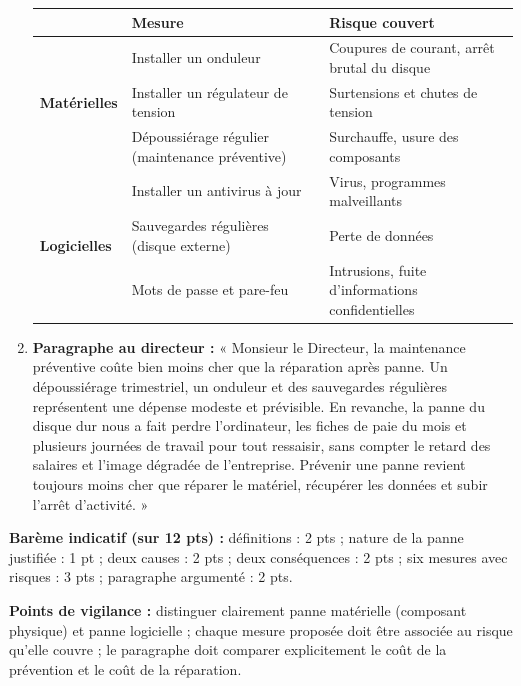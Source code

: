 \documentclass[11pt]{article}
\begin{document}
\begin{corrige}
\begin{enumerate}
\begin{center}
\begin{tabularx}{\linewidth}{|l|X|X|}
\hline
\rowcolor{popblueL} & \textbf{Mesure} & \textbf{Risque couvert} \\
\hline
\multirow{3}{*}{\textbf{Matérielles}} & Installer un onduleur & Coupures de courant, arrêt brutal du disque \\
\cline{2-3}
 & Installer un régulateur de tension & Surtensions et chutes de tension \\
\cline{2-3}
 & Dépoussiérage régulier (maintenance préventive) & Surchauffe, usure des composants \\
\hline
\multirow{3}{*}{\textbf{Logicielles}} & Installer un antivirus à jour & Virus, programmes malveillants \\
\cline{2-3}
 & Sauvegardes régulières (disque externe) & Perte de données \\
\cline{2-3}
 & Mots de passe et pare-feu & Intrusions, fuite d'informations confidentielles \\
\hline
\end{tabularx}
\end{center}
\item \textbf{Paragraphe au directeur :} « Monsieur le Directeur, la maintenance préventive coûte bien moins cher que la réparation après panne. Un dépoussiérage trimestriel, un onduleur et des sauvegardes régulières représentent une dépense modeste et prévisible. En revanche, la panne du disque dur nous a fait perdre l'ordinateur, les fiches de paie du mois et plusieurs journées de travail pour tout ressaisir, sans compter le retard des salaires et l'image dégradée de l'entreprise. Prévenir une panne revient toujours moins cher que réparer le matériel, récupérer les données et subir l'arrêt d'activité. »
\end{enumerate}

\textbf{Barème indicatif (sur 12 pts) :} définitions : 2 pts ; nature de la panne justifiée : 1 pt ; deux causes : 2 pts ; deux conséquences : 2 pts ; six mesures avec risques : 3 pts ; paragraphe argumenté : 2 pts.

\textbf{Points de vigilance :} distinguer clairement panne matérielle (composant physique) et panne logicielle ; chaque mesure proposée doit être associée au risque qu'elle couvre ; le paragraphe doit comparer explicitement le coût de la prévention et le coût de la réparation.
\end{corrige}
\end{document}
